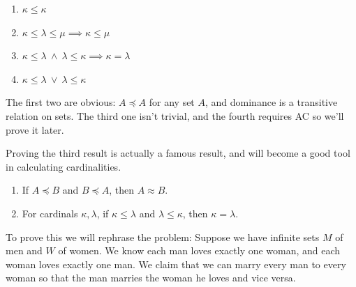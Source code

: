 \begin{enumerate}
    \item $\kappa \leq \kappa$
    \item $\kappa \leq \lambda \leq \mu \implies \kappa \leq \mu$
    \item $\kappa \leq \lambda \ \wedge \ \lambda \leq \kappa \implies \kappa = \lambda$ 
    \item $\kappa \leq \lambda \ \vee \ \lambda \leq \kappa$
\end{enumerate}

The first two are obvious: $A \preceq A$ for any set $A$, and dominance is a transitive relation on sets. The third one isn't trivial, and the fourth requires AC so we'll prove it later. 

Proving the third result is actually a famous result, and will become a good tool in calculating cardinalities. 

\begin{theorem}
    \begin{enumerate}[label=(\alph*)]
        \item If $A \preceq B$ and $B \preceq A$, then $A \approx B$. 
        \item For cardinals $\kappa, \lambda$, if $\kappa \leq \lambda$ and $\lambda \leq \kappa$, then $\kappa = \lambda$. 
    \end{enumerate}
\end{theorem}

To prove this we will rephrase the problem: Suppose we have infinite sets $M$ of men and $W$ of women. We know each man loves exactly one woman, and each woman loves exactly one man. We claim that we can marry every man to every woman so that the man marries the woman he loves and vice versa. 

